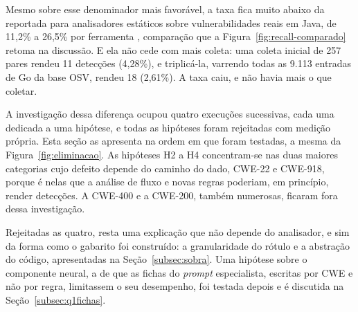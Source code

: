 Mesmo sobre esse denominador mais favorável, a taxa fica muito abaixo da reportada para analisadores estáticos sobre vulnerabilidades reais em Java, de 11,2\% a 26,5\% por ferramenta \cite{bennett2024semgrep}, comparação que a Figura~\ref{fig:recall-comparado} retoma na discussão. E ela não cede com mais coleta: uma coleta inicial de 257 pares rendeu 11 detecções (4,28\%), e triplicá-la, varrendo todas as 9.113 entradas de Go da base OSV, rendeu 18 (2,61\%). A taxa caiu, e não havia mais o que coletar.

A investigação dessa diferença ocupou quatro execuções sucessivas, cada uma dedicada a uma hipótese, e todas as hipóteses foram rejeitadas com medição própria. Esta seção as apresenta na ordem em que foram testadas, a mesma da Figura~\ref{fig:eliminacao}. As hipóteses H2 a H4 concentram-se nas duas maiores categorias cujo defeito depende do caminho do dado, CWE-22 e CWE-918, porque é nelas que a análise de fluxo e novas regras poderiam, em princípio, render detecções. A CWE-400 e a CWE-200, também numerosas, ficaram fora dessa investigação.

Rejeitadas as quatro, resta uma explicação que não depende do analisador, e sim da forma como o gabarito foi construído: a granularidade do rótulo e a abstração do código, apresentadas na Seção~\ref{subsec:sobra}. Uma hipótese sobre o componente neural, a de que as fichas do \textit{prompt} especialista, escritas por CWE e não por regra, limitassem o seu desempenho, foi testada depois e é discutida na Seção~\ref{subsec:q1fichas}.

